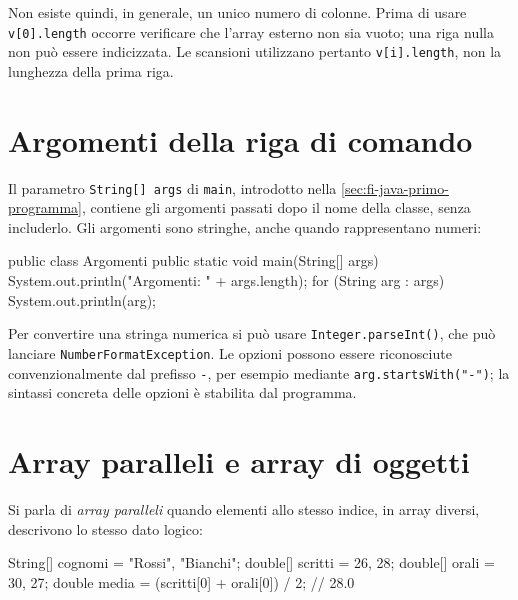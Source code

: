 Non esiste quindi, in generale, un unico numero di colonne.
Prima di usare \texttt{v[0].length} occorre verificare che
l'array esterno non sia vuoto; una riga nulla non può
essere indicizzata. Le scansioni utilizzano pertanto
\texttt{v[i].length}, non la lunghezza della prima riga.

\section{Argomenti della riga di comando}
\label{sec:fi-java-array-argomenti}

Il parametro \texttt{String[] args} di \texttt{main}, introdotto
nella \cref{sec:fi-java-primo-programma}, contiene gli argomenti
passati dopo il nome della classe, senza includerlo.
Gli argomenti sono stringhe, anche quando rappresentano numeri:

\begin{unipdcode}[language=Java]
public class Argomenti {
    public static void main(String[] args) {
        System.out.println("Argomenti: " + args.length);
        for (String arg : args)
            System.out.println(arg);
    }
}
\end{unipdcode}


Per convertire una stringa numerica si può usare
\texttt{Integer.parseInt()}, che può lanciare
\texttt{NumberFormatException}. Le opzioni possono essere
riconosciute convenzionalmente dal prefisso \texttt{-}, per
esempio mediante \texttt{arg.startsWith("-")}; la sintassi
concreta delle opzioni è stabilita dal programma.

\section{Array paralleli e array di oggetti}
\label{sec:fi-java-array-paralleli}

Si parla di \emph{array paralleli} quando elementi allo stesso
indice, in array diversi, descrivono lo stesso dato logico:

\begin{unipdcode}[language=Java]
String[] cognomi = {"Rossi", "Bianchi"};
double[] scritti = {26, 28};
double[] orali = {30, 27};
double media = (scritti[0] + orali[0]) / 2; // 28.0
\end{unipdcode}

